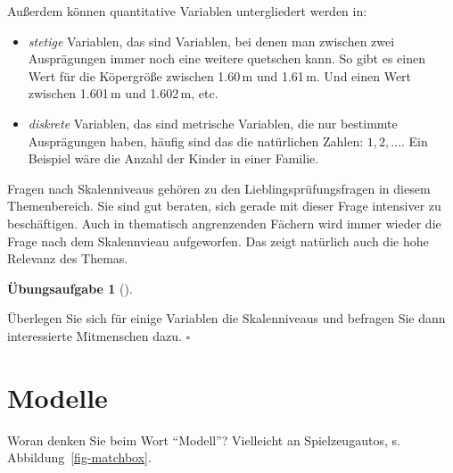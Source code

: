 \documentclass[
  letterpaper,
]{scrbook}
\providecommand{\tightlist}{%
  \setlength{\itemsep}{0pt}\setlength{\parskip}{0pt}}\usepackage{longtable,booktabs,array}
\theoremstyle{definition}
\newtheorem{exercise}{Übungsaufgabe}[chapter]
\theoremstyle{definition}
\theoremstyle{definition}
\theoremstyle{remark}
\begin{document}
Außerdem können quantitative Variablen untergliedert werden in:

\begin{itemize}
\tightlist
\item
  \emph{stetige} Variablen, das sind Variablen, bei denen man zwischen
  zwei Ausprägungen immer noch eine weitere quetschen kann. So gibt es
  einen Wert für die Köpergröße zwischen 1.60\,m und 1.61\,m. Und einen
  Wert zwischen 1.601\,m und 1.602\,m, etc.
\item
  \emph{diskrete} Variablen, das sind metrische Variablen, die nur
  bestimmte Ausprägungen haben, häufig sind das die natürlichen Zahlen:
  \(1,2,...\). Ein Beispiel wäre die Anzahl der Kinder in einer Familie.
\end{itemize}

\begin{tcolorbox}[enhanced jigsaw, colbacktitle=quarto-callout-tip-color!10!white, toptitle=1mm, colframe=quarto-callout-tip-color-frame, breakable, toprule=.15mm, bottomrule=.15mm, bottomtitle=1mm, left=2mm, opacitybacktitle=0.6, colback=white, arc=.35mm, coltitle=black, title=\textcolor{quarto-callout-tip-color}{\faLightbulb}\hspace{0.5em}{Tipp}, opacityback=0, rightrule=.15mm, leftrule=.75mm, titlerule=0mm]

Fragen nach Skalenniveaus gehören zu den Lieblingsprüfungsfragen in
diesem Themenbereich. Sie sind gut beraten, sich gerade mit dieser Frage
intensiver zu beschäftigen. Auch in thematisch angrenzenden Fächern wird
immer wieder die Frage nach dem Skalennvieau aufgeworfen. Das zeigt
natürlich auch die hohe Relevanz des Themas.

\end{tcolorbox}

\begin{exercise}[]\protect\hypertarget{exr-skalenniveaus}{}\label{exr-skalenniveaus}

Überlegen Sie sich für einige Variablen die Skalenniveaus und befragen
Sie dann interessierte Mitmenschen dazu. \(\square\)

\end{exercise}

\section{Modelle}\label{modelle}

Woran denken Sie beim Wort \enquote{Modell}? Vielleicht an
Spielzeugautos, s. Abbildung~\ref{fig-matchbox}.
\end{document}
